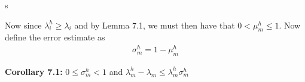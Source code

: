 s\documentclass[../../main.tex]{subfiles}
\begin{document}
Now since $\lambda_{i}^{h} \geq \lambda_{i}$ and by Lemma 7.1, we must then have that $0 < \mu_{m}^{h} \leq 1$. Now define the error estimate as
\begin{eqnarray*}
\sigma_{m}^{h} = 1 - \mu_{m}^{h}
\end{eqnarray*}


\textbf{Corollary 7.1:} $0 \leq \sigma_{m}^{h} < 1$ and $\lambda_{m}^{h} - \lambda_{m} \leq \lambda_{m}^{h}\sigma_{m}^{h}$\\

\begin{comment}
\textbf{Proof:}
\begin{eqnarray*}
\lambda_{m}^{h} & \leq & \frac{\lambda_{m}}{\mu_{m}^{h}} \ \ \textrm { (by Lemma 7.1)} \\
\lambda_{m}^{h}\mu_{m}^{h}& \leq & \lambda_{m} \\
-\lambda_{m}& \leq & -\lambda_{m}^{h}\mu_{m}^{h} \\
\lambda_{m}^{h} -\lambda_{m}& \leq & \lambda_{m}^{h} -\lambda_{m}^{h}\mu_{m}^{h}\\
\lambda_{m}^{h} -\lambda_{m}& \leq & \lambda_{m}^{h}\sigma_{m}^{h}
\end{eqnarray*}\qed


So from this Corollary 7.1, we see that to prove that our approximate eigenvalues converge to the exact eigenvalues. The only thing then left to prove is  that $\sigma_{m}^{h} \rightarrow 0$ as $h \rightarrow 0$.\\
\\


\textbf{Proposition 7.1} $\sigma_{m}^{h} = \max\left\{ 2( u,u-Pu )-||u-Pu||^{2} \ | \ u \in B_{m} \right \}$\\


\textbf{Proof:}  Let $u \in B_{m}$. Then
\begin{eqnarray*}
||u - Pu||^{2} &=& ( u - Pu, u - Pu ) \\
				&=& ( u, u ) - 2 ( u, Pu ) + ( Pu, Pu ) \\
				&=& 2( u, u ) - 2 ( u, Pu ) + ( Pu, Pu ) - ( u, u )\\
				&=& 2( u, u - Pu ) + ( Pu, Pu ) - ( u, u )\\
( u, u ) - ( Pu, Pu )  & = & 2( u, u - Pu ) - ||u - Pu||^{2}	
\end{eqnarray*}
Now since $u \in B_{m}$, $<u,u> = 1$. So we have
\begin{eqnarray*}
1 - ||Pu||^{2}  & = & 2( u, u - Pu ) - ||u - Pu||^{2}	
\end{eqnarray*}
Now the right hand side, $1 - ||Pu||^{2} \leq 1 - \mu_{m}^{h} = \sigma_{m}^{h}$ for all $u \in B_{m}$. So then we must have that
\begin{eqnarray*}
\sigma_{m}^{h} = \max\left\{ 2( u,u-Pu )-||u-Pu||^{2} \ | \ u \in B_{m} \right \}
\end{eqnarray*}\qed
\end{comment}
\end{document}
